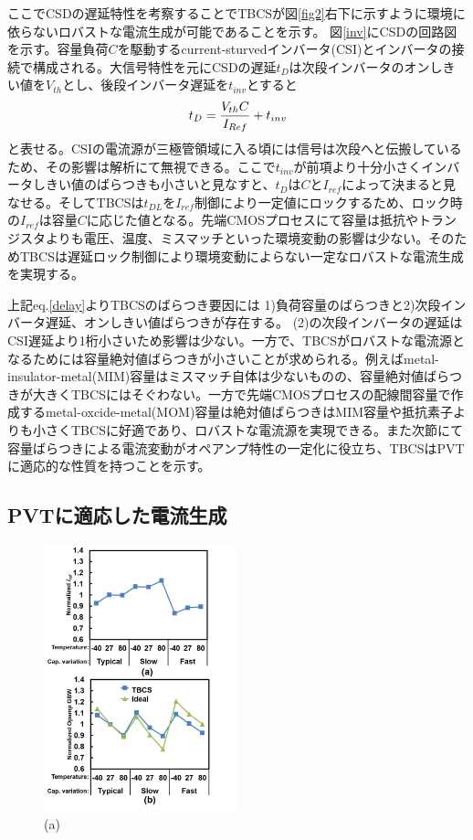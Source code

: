 \documentclass[letterpaper, 10 pt, conference]{ieeeconf}  %
\begin{document}
ここでCSDの遅延特性を考察することでTBCSが図\ref{fig2}右下に示すように環境に依らないロバストな電流生成が可能であることを示す。
図\ref{inv}にCSDの回路図を示す。容量負荷$C$を駆動するcurrent-sturvedインバータ(CSI)\cite{mroszczyk2014tunable}とインバータの接続で構成される。大信号特性を元にCSDの遅延$t_D$は次段インバータのオンしきい値を$V_{th}$とし、後段インバータ遅延を$t_{inv}$とすると
\begin{eqnarray}
    \centering
    t_D = \frac{V_{th}C}{I_{Ref}}+t_{inv}
    \label{delay}
\end{eqnarray}
と表せる。CSIの電流源が三極管領域に入る頃には信号は次段へと伝搬しているため、その影響は解析にて無視できる。ここで$t_{inv}$が前項より十分小さくインバータしきい値のばらつきも小さいと見なすと、$t_D$は$C$と$I_{ref}$によって決まると見なせる。そしてTBCSは$t_{DL}$を$I_{ref}$制御により一定値にロックするため、ロック時の$I_{ref}$は容量$C$に応じた値となる。先端CMOSプロセスにて容量は抵抗やトランジスタよりも電圧、温度、ミスマッチといった環境変動の影響は少ない。そのためTBCSは遅延ロック制御により環境変動によらない一定なロバストな電流生成を実現する。

上記eq.\ref{delay}よりTBCSのばらつき要因には 1)負荷容量のばらつきと2)次段インバータ遅延、オンしきい値ばらつきが存在する。
(2)の次段インバータの遅延はCSI遅延より1桁小さいため影響は少ない。一方で、TBCSがロバストな電流源となるためには容量絶対値ばらつきが小さいことが求められる。例えばmetal-insulator-metal(MIM)容量はミスマッチ自体は少ないものの、容量絶対値ばらつきが大きくTBCSにはそぐわない。一方で先端CMOSプロセスの配線間容量で作成するmetal-oxcide-metal(MOM)容量は絶対値ばらつきはMIM容量や抵抗素子よりも小さくTBCSに好適であり、ロバストな電流源を実現できる。また次節にて容量ばらつきによる電流変動がオペアンプ特性の一定化に役立ち、TBCSはPVTに適応的な性質を持つことを示す。

\subsection{PVTに適応した電流生成}
\begin{figure}[!]
\centering
 \includegraphics[width=0.5\textwidth]{figs/iref_var.png}
  \caption{(a) 
}
\label{cvar}
\end{figure}
\end{document}
